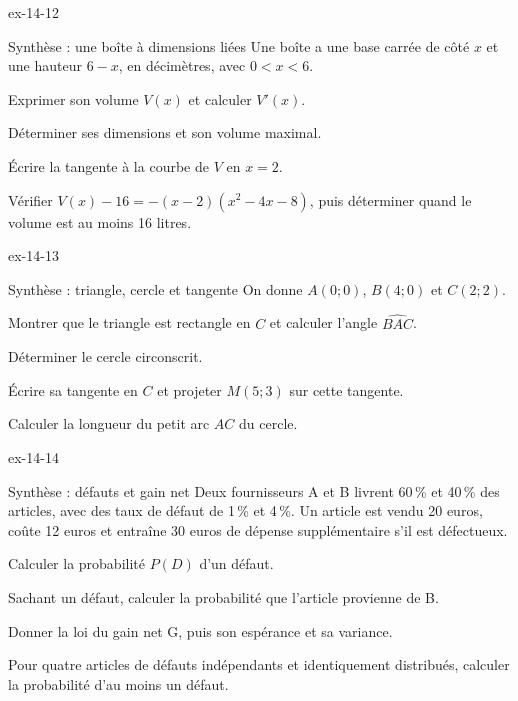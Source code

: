 \clearpage
{}
\begin{blocLivre}{ex-14-12}
\begin{exercice}[3]{Synthèse : une boîte à dimensions liées}
Une boîte a une base carrée de côté $x$ et une hauteur $6-x$, en décimètres, avec $0<x<6$.\begin{questions}
\item Exprimer son volume $V(x)$ et calculer $V\prime(x)$.
\item Déterminer ses dimensions et son volume maximal.
\item Écrire la tangente à la courbe de $V$ en $x=2$.
\item Vérifier $V(x)-16=-(x-2)(x^2-4x-8)$, puis déterminer quand le volume est au moins 16 litres.
\end{questions}
\label{figlivre-r14-12-boite-ex}

\end{exercice}
\end{blocLivre}
\begin{blocLivre}{ex-14-13}
\begin{exercice}[3]{Synthèse : triangle, cercle et tangente}
On donne $A(0;0)$, $B(4;0)$ et $C(2;2)$.\begin{questions}
\item Montrer que le triangle est rectangle en $C$ et calculer l’angle $\widehat{BAC}$.
\item Déterminer le cercle circonscrit.
\item Écrire sa tangente en $C$ et projeter $M(5;3)$ sur cette tangente.
\item Calculer la longueur du petit arc $AC$ du cercle.
\end{questions}
\label{figlivre-r14-13-geometrie-ex}

\end{exercice}
\end{blocLivre}
\begin{blocLivre}{ex-14-14}
\begin{exercice}[3]{Synthèse : défauts et gain net}
Deux fournisseurs A et B livrent 60\,\% et 40\,\% des articles, avec des taux de défaut de 1\,\% et 4\,\%. Un article est vendu 20 euros, coûte 12 euros et entraîne 30 euros de dépense supplémentaire s’il est défectueux.\begin{questions}
\item Calculer la probabilité $P(D)$ d’un défaut.
\item Sachant un défaut, calculer la probabilité que l’article provienne de B.
\item Donner la loi du gain net G, puis son espérance et sa variance.
\item Pour quatre articles de défauts indépendants et identiquement distribués, calculer la probabilité d’au moins un défaut.
\end{questions}
\label{figlivre-r14-14-ex}

\end{exercice}
\end{blocLivre}

